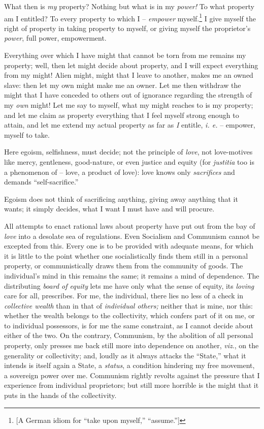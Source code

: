 \documentclass[12pt,a4paper]{book}
\begin{document}
What then is \textit{my} property? Nothing but what is in my \textit{power!} 
To what property am I entitled? To every property to which I -- 
\textit{empower} myself.\footnote{[A German idiom for ``take upon myself,'' 
``assume.'']} I give myself the right of property in taking property to 
myself, or giving myself the proprietor's \textit{power}, full power, 
empowerment.

Everything over which I have might that cannot be torn from me remains my 
property; well, then let might decide about property, and I will expect 
everything from my might! Alien might, might that I leave to another, makes me 
an owned slave: then let my own might make me an owner. Let me then withdraw 
the might that I have conceded to others out of ignorance regarding the 
strength of my \textit{own} might! Let me say to myself, what my might reaches 
to is my property; and let me claim as property everything that I feel myself 
strong enough to attain, and let me extend my actual property as far as 
\textit{I} entitle, \textit{i. e.} -- empower, myself to take.

Here egoism, selfishness, must decide; not the principle of \textit{love}, not 
love-motives like mercy, gentleness, good-nature, or even justice and equity 
(for \textit{justitia} too is a phenomenon of -- love, a product of love): 
love knows only \textit{sacrifices} and demands ``self-sacrifice.''

Egoism does not think of sacrificing anything, giving away anything that it 
wants; it simply decides, what I want I must have and will procure.

All attempts to enact rational laws about property have put out from the bay 
of \textit{love} into a desolate sea of regulations. Even Socialism and 
Communism cannot be excepted from this. Every one is to be provided with 
adequate means, for which it is little to the point whether one 
socialistically finds them still in a personal property, or communistically 
draws them from the community of goods. The individual's mind in this remains 
the same; it remains a mind of dependence. The distributing \textit{board of 
equity} lets me have only what the sense of equity, its \textit{loving} care 
for all, prescribes. For me, the individual, there lies no less of a check in 
\textit{collective wealth} than in that of \textit{individual others;} neither 
that is mine, nor this: whether the wealth belongs to the collectivity, which 
confers part of it on me, or to individual possessors, is for me the same 
constraint, as I cannot decide about either of the two. On the contrary, 
Communism, by the abolition of all personal property, only presses me back 
still more into dependence on another, \textit{viz}., on the generality or 
collectivity; and, loudly as it always attacks the ``State,'' what it 
intends is itself again a State, a \textit{status}, a condition hindering my 
free movement, a sovereign power over me. Communism rightly revolts against 
the pressure that I experience from individual proprietors; but still more 
horrible is the might that it puts in the hands of the collectivity.
\end{document}

